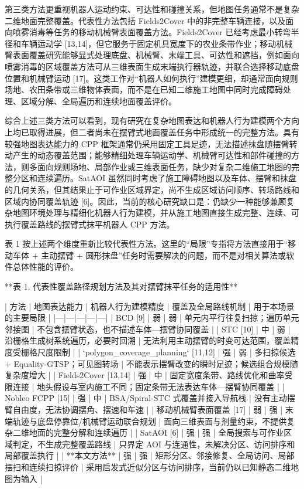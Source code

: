   

第三类方法更重视机器人运动约束、可达性和碰撞关系，但地图任务通常不是复杂二维地面完整覆盖。代表性方法包括 Fields2Cover 中的非完整车辆连接，以及面向喷雾消毒等任务的移动机械臂表面覆盖方法。Fields2Cover 已经考虑最小转弯半径和车辆运动学 [13,14]，但它服务于固定机具宽度下的农业条带作业；移动机械臂表面覆盖研究能够显式处理底盘、机械臂、末端工具、可达性和遮挡，例如面向喷雾消毒的区域覆盖方法可从三维表面生成末端执行器轨迹，并联合选择移动底盘位置和机械臂运动 [17]。这类工作对“机器人如何执行”建模更细，却通常面向规则场地、农田条带或三维物体表面，而不是在已知二维施工地图中同时完成障碍处理、区域分解、全局遍历和连续地面覆盖评价。

  

综合上述三类方法可以看到，现有研究在复杂地图表达和机器人行为建模两个方向上均已取得进展，但二者尚未在摆臂式地面覆盖任务中形成统一的完整方法。具有较强地图表达能力的 CPP 框架通常仍采用固定工具足迹，无法描述抹盘随摆臂转动产生的动态覆盖范围；能够精细处理车辆运动学、机械臂可达性和部件碰撞的方法，则多面向规则场地、局部作业或三维表面任务，缺少对复杂二维施工地图的完整分区和连续遍历。SatAOI 虽然同时考虑了施工障碍地图以及车体、摆臂和抹盘的几何关系，但其结果止于可作业区域界定，尚不生成区域访问顺序、转场路线和区域内协同覆盖轨迹 [6]。因此，当前的核心研究缺口是：仍缺少一种能够兼顾复杂地图环境处理与精细化机器人行为建模，并从施工地图直接生成完整、连续、可执行覆盖路线的摆臂式抹平机器人 CPP 方法。

  

表 1 按上述两个维度重新比较代表性方法。这里的“局限”专指将方法直接用于“移动车体 + 主动摆臂 + 圆形抹盘”任务时需要解决的问题，而不是对相关算法或软件总体性能的评价。

  

**表 1. 代表性覆盖路径规划方法及其对摆臂抹平任务的适用性**

  

| 方法 | 地图表达能力 | 机器人行为建模精度 | 覆盖及全局路线机制 | 用于本场景的主要局限 |
|---|---|---|---|---|
| BCD [9] | 弱 | 弱 | 单元内平行往复扫掠；遍历单元邻接图 | 不包含摆臂状态，也不描述车体—摆臂协同覆盖 |
| STC [10] | 中 | 弱 | 沿栅格生成树系统遍历，必要时回溯 | 无法利用主动摆臂的时变可达范围，覆盖精度受栅格尺度限制 |
| `polygon_coverage_planning` [11,12] | 强 | 弱 | 多扫掠候选 + Equality-GTSP；可见图转场 | 不能表示摆臂改变的瞬时足迹；候选组合规模随复杂度增大 |
| Fields2Cover [13,14] | 强 | 中 | 固定宽度条带、路线优化和曲率受限连接 | 地头假设与室内施工不同；固定条带无法表达车体—摆臂协同覆盖 |
| Nobleo FCPP [15] | 强 | 中 | BSA/Spiral-STC 式覆盖并接入导航栈 | 没有主动摆臂自由度，无法协调摆角、摆速和车速 |
| 移动机械臂表面覆盖 [17] | 弱 | 强 | 末端轨迹与底盘停靠位/机械臂运动联合规划 | 面向三维表面与剂量约束，不提供复杂二维地面的完整分解和连续遍历 |
| SatAOI [6] | 强 | 强 | 全局搜索与可作业区域判定，不生成完整覆盖路线 | 只界定 AOI 与连通性，未解决分区、访问排序和局部覆盖执行 |
| **本文方法** | 强 | 强 | 矩形分区、邻接修复、全局访问、局部摆扫和连续扫掠评价 | 采用启发式近似分区与访问排序，当前仍以已知静态二维地图为输入 |

